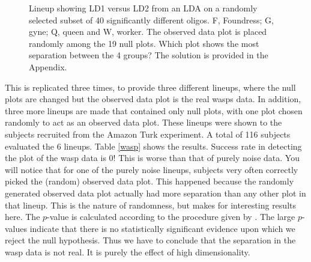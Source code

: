\begin{figure}[hbtp]
   \centering
       \caption{Lineup showing LD1 versus LD2 from an LDA on a randomly selected subset of 40 significantly different oligos. F, Foundress; G, gyne; Q, queen and W, worker. The observed data plot is placed randomly among the 19 null plots. Which plot shows the most separation between the 4 groups? The solution is provided in the Appendix.}
       \label{toth_lineup}
\end{figure} 

This is replicated three times, to provide three different lineups, where the null plots are changed but the observed data plot is the real wasps data. In addition, three more lineups are made that contained only null plots, with one plot chosen randomly to act as an observed data plot. These lineups were shown to the subjects recruited from the Amazon Turk experiment.  A total of 116 subjects evaluated the 6 lineups. Table \ref{wasp} shows the results. Success rate in detecting the plot of the wasp data is 0! This is worse than that of purely noise data. You will notice that for one of the purely noise lineups, subjects very often correctly picked the (random) observed data plot. This happened because the randomly generated observed data plot actually had more separation than any other plot in that lineup. This is the nature of randomness, but makes for interesting results here. The $p$-value is calculated according to the procedure given by \cite{majumder:2011}. The large $p$-values indicate that there is no statistically significant evidence upon which we reject the null hypothesis. Thus we have to conclude that the separation in the wasp data is not real. It is purely the effect of high dimensionality. 

